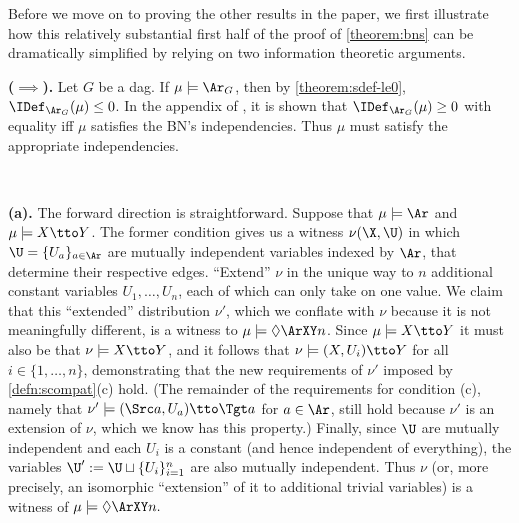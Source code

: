\begin{subappendices}
Before we move on to proving the other results in the paper, we first illustrate how this relatively substantial first half of the proof of \cref{theorem:bns} can be dramatically simplified by relying on two information theoretic arguments.

\begin{lproof}
    \textbf{($\implies$).}
    Let $G$ be a dag.     
    If $\mu \models \Ar_{G}$, then by \cref{theorem:sdef-le0}, 
    $\IDef_{\Ar_{G}}(\mu) \le 0$. In the appendix of \cite{pdg-aaai}, it is shown that $\IDef_{\Ar_G}(\mu) \ge 0$ with equality iff $\mu$ satisfies the BN's independencies. 
    Thus $\mu$ must satisfy the appropriate independencies.
\end{lproof}


~%
\begin{lproof}\label{proof:func}
\textbf{(a).} 
The forward direction is straightforward. 
Suppose that $\mu \models \Ar$ and $\mu \models X \tto Y$.
The former condition gives us a witness
$\nu(\X,\U)$ in which $\U = \{ U_a \}_{a \in \Ar}$ are mutually independent variables indexed by $\Ar$, that determine their respective edges. 
``Extend'' $\nu$ in the unique way to $n$ additional constant variables $U_1, \ldots, U_n$, each of which can only take on one value. 
We claim that this ``extended'' distribution $\nu'$, which we conflate with $\nu$ because it is not meaningfully different, is a witness to $\mu \models  \Diamond \ArXY n$.
Since $\mu \models X \tto Y$ it must also be that $\nu \models X \tto Y$, and it follows that $\nu \models (X,U_i)\tto Y$ for all $i \in \{1,\ldots,n\}$, demonstrating that
the new requirements of $\nu'$ imposed by \cref{defn:scompat}(c) hold. 
(The remainder of the requirements for condition (c), namely that $\nu' \models (\Src a, U_a) \tto \Tgt a$ for $a \in \Ar$, still hold because $\nu'$ is an extension of $\nu$, which we know has this property.)
Finally, since $\U$ are mutually independent and each $U_i$ is a constant (and hence independent of everything), the variables $\U' := \U \sqcup \{ U_i \}_{i=1}^n$ are also mutually independent. 
Thus $\nu$ (or, more precisely, an isomorphic ``extension'' of it to additional trivial variables) is a witness of
 $\mu \models  \Diamond \ArXY n.$
 

\end{lproof}
\end{subappendices}
